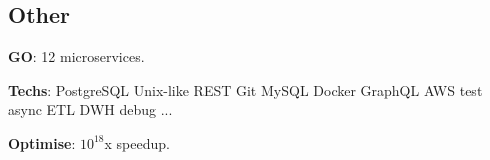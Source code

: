 \documentclass[a4paper]{MagicalCV}
\begin{document}
\begin{minipage}[t]{0.33\textwidth}
\subsection{Other}
\begin{tightemize}
\item {\bf GO}: 12 microservices.
\item {\bf Techs}: PostgreSQL \textbullet{} Unix-like \textbullet{} REST \textbullet{} Git \textbullet{} MySQL \textbullet{} Docker \textbullet{}
 GraphQL \textbullet{} AWS \textbullet{} test \textbullet{} async \textbullet{} ETL \textbullet{} DWH \textbullet{} debug \textbullet{} ...
\item {\bf Optimise}: $10^{18}$x speedup.
\end{tightemize}

\end{minipage}
\hfill
\end{document}
